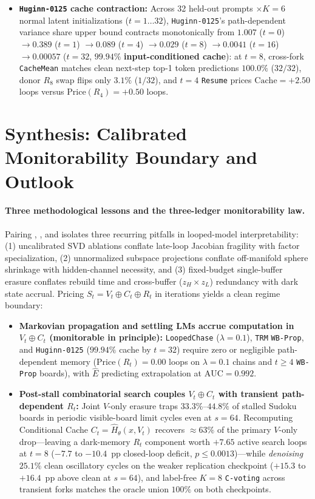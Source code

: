 \documentclass[10pt,letterpaper]{article}
\begin{document}
\begin{itemize}
  \item \textbf{\texttt{Huginn-0125} cache contraction:} Across 32 held-out prompts $\times K=6$ normal latent initializations ($t=1\dots 32$), \texttt{Huginn-0125}'s path-dependent variance share upper bound contracts monotonically from $1.007$ ($t=0$) $\to 0.389$ ($t=1$) $\to 0.089$ ($t=4$) $\to \mathbf{0.029}$ ($t=8$) $\to 0.0041$ ($t=16$) $\to \mathbf{0.00057}$ ($t=32$, $\mathbf{99.94\%}$ \textbf{input-conditioned cache}): at $t=8$, cross-fork \texttt{CacheMean} matches clean next-step top-1 token predictions $100.0\%$ ($32/32$), donor $R_8$ swap flips only $3.1\%$ ($1/32$), and $t=4$ \texttt{Resume} prices $\mathrm{Cache} = +2.50$ loops versus $\mathrm{Price}(R_4) = +0.50$ loops.
\end{itemize}

\section{Synthesis: Calibrated Monitorability Boundary and Outlook}\label{sec:discussion}

\paragraph{Three methodological lessons and the three-ledger monitorability law.} Pairing , , and  isolates three recurring pitfalls in looped-model interpretability: (1) uncalibrated SVD ablations conflate late-loop Jacobian fragility with factor specialization, (2) unnormalized subspace projections conflate off-manifold sphere shrinkage with hidden-channel necessity, and (3) fixed-budget single-buffer erasure conflates rebuild time and cross-buffer ($z_H \times z_L$) redundancy with dark state accrual. Pricing $S_t = V_t \oplus C_t \oplus R_t$ in iterations yields a clean regime boundary:
\begin{itemize}
  \item \textbf{Markovian propagation and settling LMs accrue computation in $V_t \oplus C_t$ (monitorable in principle):} \texttt{LoopedChase} ($\lambda=0.1$), \texttt{TRM} \texttt{WB-Prop}, and \texttt{Huginn-0125} ($99.94\%$ cache by $t=32$) require zero or negligible path-dependent memory ($\mathrm{Price}(R_t) = 0.00$ loops on $\lambda=0.1$ chains and $t \ge 4$ \texttt{WB-Prop} boards), with $\hat{E}$ predicting extrapolation at $\mathrm{AUC}=0.992$.
  \item \textbf{Post-stall combinatorial search couples $V_t \oplus C_t$ with transient path-dependent $R_t$:} Joint $V$-only erasure traps $33.3\%$--$44.8\%$ of stalled Sudoku boards in periodic visible-board limit cycles even at $s=64$. Recomputing Conditional Cache $C_t = \hat{H}_\theta(x,V_t)$ recovers $\approx 63\%$ of the primary $V$-only drop—leaving a dark-memory $R_t$ component worth $+7.65$ active search loops at $t=8$ ($-7.7$ to $-10.4$~pp closed-loop deficit, $p \le 0.0013$)—while \emph{denoising} $25.1\%$ clean oscillatory cycles on the weaker replication checkpoint ($+15.3$ to $+16.4$~pp above clean at $s=64$), and label-free $K=8$ \texttt{C-voting} across transient forks matches the oracle union $100\%$ on both checkpoints.
\end{itemize}
\end{document}
